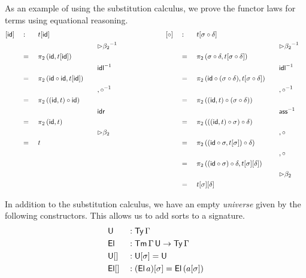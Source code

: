 \documentclass[acmsmall,review,anonymous]{acmart}\settopmatter{printfolios=true,printccs=false,printacmref=false}
\begin{document}
As an example of using the substitution calculus, we prove the functor
laws for terms using equational reasoning.
\begin{alignat*}{15}
  & [\id] && : && t[\id] &&                      && && \hspace{6em} [\circ] && : && t[\sigma\circ\delta] \\
  & && && && && {\rhd\beta_2}^{-1}                && && && && && {\rhd\beta_2}^{-1} \\
  & && = \,\, && \pi_2\,(\id, t[\id]) &&         && && && = \,\, && \pi_2\,(\sigma\circ\delta, t[\sigma\circ\delta]) \\
  & && && && && {\idl}^{-1}                       && && && && && {\idl}^{-1} \\
  & && = \,\, && \pi_2\,(\id\circ\id, t[\id])    && && && && = \,\, && \pi_2\,(\id\circ(\sigma\circ\delta), t[\sigma\circ\delta]) \\
  & && && && && {,\circ}^{-1}                    && && && && && {,\circ}^{-1} \\
  & && = \,\, && \pi_2\,((\id, t)\circ\id) &&    && && && = \,\, && \pi_2\,((\id, t)\circ(\sigma\circ\delta)) \\
  & && && && && \idr                             && && && && && \ass^{-1} \\
  & && = \,\, && \pi_2\,(\id, t) &&              && && && = \,\, && \pi_2\,(((\id, t)\circ\sigma)\circ\delta) \\
  & && && && && {\rhd\beta_2}                    && && && && && {,\circ} \\
  & && = \,\, && t &&                            && && && = \,\, && \pi_2\,((\id\circ\sigma, t[\sigma])\circ\delta) \\
  & && && &&                                     && && && && && && {,\circ} \\
  & && && &&                                     && && && = \,\, && \pi_2\,((\id\circ\sigma)\circ\delta, t[\sigma][\delta]) \\
  & && && &&                                     && && && && && && {\rhd\beta_2} \\
  & && && &&                                     && && && = \,\, && t[\sigma][\delta]
\end{alignat*}

In addition to the substitution calculus, we have an empty {\em
  universe} given by the following constructors. This allows us to add
sorts to a signature.
\begin{alignat*}{5}
  & \mathsf{U} && : \mathsf{Ty}\,\Gamma \\
  & \mathsf{El} && : \mathsf{Tm}\,\Gamma\,\mathsf{U} \rightarrow \mathsf{Ty}\,\Gamma \\
  & {\mathsf{U}[]} && : \mathsf{U}[\sigma] = \mathsf{U} \\
  & {\mathsf{El}[]} && : (\mathsf{El}\,a)[\sigma] = \mathsf{El}\,(a[\sigma])
\end{alignat*}
\end{document}
